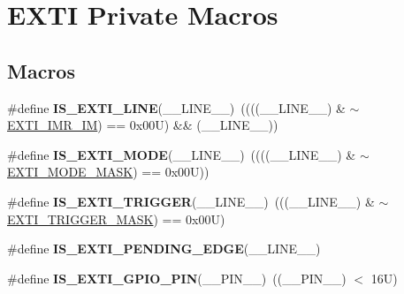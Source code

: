 \hypertarget{group___e_x_t_i___private___macros}{}\section{E\+X\+TI Private Macros}
\label{group___e_x_t_i___private___macros}
\subsection*{Macros}
\begin{DoxyCompactItemize}
\item 
\mbox{\label{group___e_x_t_i___private___macros_gab9eb047b8a317ec5f38c9bfcca65744c}} 
\#define {\bfseries I\+S\+\_\+\+E\+X\+T\+I\+\_\+\+L\+I\+NE}(\+\_\+\+\_\+\+L\+I\+N\+E\+\_\+\+\_\+)~((((\+\_\+\+\_\+\+L\+I\+N\+E\+\_\+\+\_\+) \& $\sim$\mbox{\hyperlink{group___peripheral___registers___bits___definition_gae4f23236f2d0bb9ed886556064714c50}{E\+X\+T\+I\+\_\+\+I\+M\+R\+\_\+\+IM}}) == 0x00\+U) \&\& (\+\_\+\+\_\+\+L\+I\+N\+E\+\_\+\+\_\+))
\item 
\mbox{\label{group___e_x_t_i___private___macros_gaa8a0977af667f831424dcd75ecb6709b}} 
\#define {\bfseries I\+S\+\_\+\+E\+X\+T\+I\+\_\+\+M\+O\+DE}(\+\_\+\+\_\+\+L\+I\+N\+E\+\_\+\+\_\+)~((((\+\_\+\+\_\+\+L\+I\+N\+E\+\_\+\+\_\+) \& $\sim$\mbox{\hyperlink{group___e_x_t_i___private___constants_ga657f081646b552ee10bdfc7af94b5cdf}{E\+X\+T\+I\+\_\+\+M\+O\+D\+E\+\_\+\+M\+A\+SK}}) == 0x00\+U))
\item 
\mbox{\label{group___e_x_t_i___private___macros_ga0a4ff8a2705f40043db7c3e5d7cf0059}} 
\#define {\bfseries I\+S\+\_\+\+E\+X\+T\+I\+\_\+\+T\+R\+I\+G\+G\+ER}(\+\_\+\+\_\+\+L\+I\+N\+E\+\_\+\+\_\+)~(((\+\_\+\+\_\+\+L\+I\+N\+E\+\_\+\+\_\+)  \& $\sim$\mbox{\hyperlink{group___e_x_t_i___private___constants_ga3e14df666414849fd5a3907a96a2a892}{E\+X\+T\+I\+\_\+\+T\+R\+I\+G\+G\+E\+R\+\_\+\+M\+A\+SK}}) == 0x00\+U)
\item 
\#define {\bfseries I\+S\+\_\+\+E\+X\+T\+I\+\_\+\+P\+E\+N\+D\+I\+N\+G\+\_\+\+E\+D\+GE}(\+\_\+\+\_\+\+L\+I\+N\+E\+\_\+\+\_\+)
\item 
\mbox{\label{group___e_x_t_i___private___macros_ga82f191b2ea96948f302dc6c2108ea534}} 
\#define {\bfseries I\+S\+\_\+\+E\+X\+T\+I\+\_\+\+G\+P\+I\+O\+\_\+\+P\+IN}(\+\_\+\+\_\+\+P\+I\+N\+\_\+\+\_\+)~((\+\_\+\+\_\+\+P\+I\+N\+\_\+\+\_\+) $<$ 16\+U)
\end{DoxyCompactItemize}


